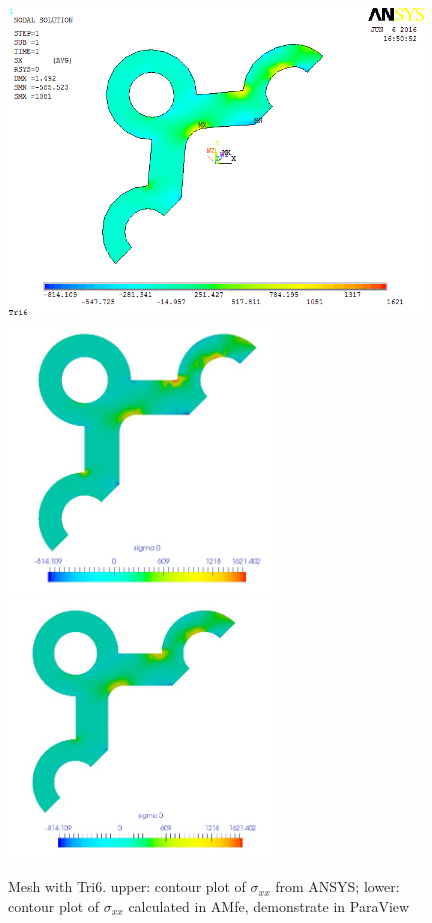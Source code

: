 \begin{figure}[htbp]
	\begin{center}
		\includegraphics[width=11cm,clip]{Tri6_Sxx.png} 	
		\includegraphics[width=7cm,clip]{Tri6_Sxx_PD.png} 	
		\includegraphics[width=7cm,clip]{Tri6_Sxx_P.png} 		
		\caption{Mesh with Tri6. upper: contour plot of $\sigma_{xx}$ from ANSYS; lower: contour plot of $\sigma_{xx}$ calculated in AMfe, demonstrate in ParaView} \label{fig: Tri6_Sxx}
	\end{center}
\end{figure}
\clearpage 

